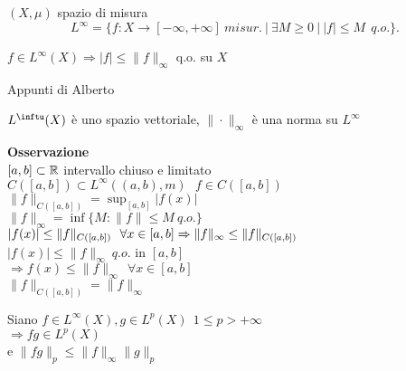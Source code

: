 \documentclass[12px]{article}
\begin{document}
  \begin{defi}
  	$(X,\mu)$ spazio di misura
	 \[
		 L^\infty = \{f: X \rightarrow [-\infty, +\infty] \ misur.\ | \ \exists M\geq 0\ | \ |f| \leq M  \ \ q.o.\}
	.\] 
  \end{defi}
  \begin{lemm}
  	$f\in L^\infty(X) \Rightarrow  |f|\leq \|f\|_\infty$ q.o. su $X$
  \end{lemm}
  \begin{dimo}
  	Appunti di Alberto
  \end{dimo}
  \begin{prop}
  	$L^\inftu(X)$ è uno spazio vettoriale,  $\|\cdot\|_\infty$ è una norma su  $L^\infty$
  \end{prop}
  \textbf{Osservazione}\\
  $[a,b]\subset\mathbb{R}$ intervallo chiuso e limitato\\
  $C([a,b])\subset L^\infty((a,b),m)\ \ \ f\in C([a,b])$\\
  $\|f\|_{C([a,b])} = \sup_{[a,b]}|f(x)|$\\
	  $\|f\|_\infty = \inf\{M: \|f\|\leq M \ q.o.\}$\\
	  $|f(x)| \leq \|f\|_{C([a,b])} \ \ \forall x\in [a,b]\\
	  \Rightarrow  \|f\|_\infty \leq \|f\|_{C([a,b])}$\\
  $|f(x)|\leq \|f\|_\infty \ q.o.$ in $[a,b]$\\
  $ \Rightarrow  f(x) \leq \|f\|_\infty \ \ \forall x\in [a,b]$ \\
  $\|f\|_{C([a,b])} = \|f\|_\infty$
   \begin{prop}
  	Siano $f\in L^\infty(X), g\in L^p(X) \ \ 1\leq p > +\infty$\\
	 $ \Rightarrow  fg\in L^p(X)$ \\
	 e $\|fg\|_p \leq \|f\|_\infty\|g\|_p$
  \end{prop}
\end{document}
